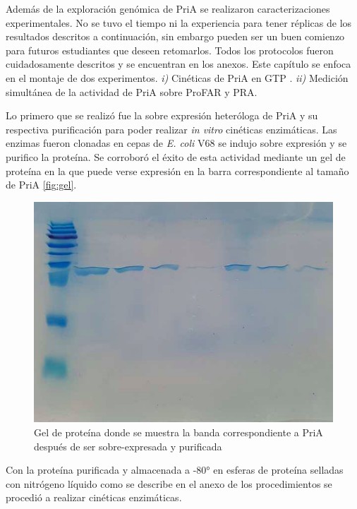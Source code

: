 \documentclass[12pt,twoside]{reedthesis}
\begin{document}
  Además de la exploración genómica de PriA se realizaron
  caracterizaciones experimentales. No se tuvo el tiempo ni la experiencia
  para tener réplicas de los resultados descritos a continuación, sin
  embargo pueden ser un buen comienzo para futuros estudiantes que deseen
  retomarlos. Todos los protocolos fueron cuidadosamente descritos y se
  encuentran en los anexos. Este capítulo se enfoca en el montaje de dos
  experimentos. \emph{i)} Cinéticas de PriA en GTP . \emph{ii)} Medición
  simultánea de la actividad de PriA sobre ProFAR y PRA.
  
  Lo primero que se realizó fue la sobre expresión heteróloga de PriA y su
  respectiva purificación para poder realizar \emph{in vitro} cinéticas
  enzimáticas. Las enzimas fueron clonadas en cepas de \emph{E. coli} V68
  se indujo sobre expresión y se purifico la proteína. Se corroboró el
  éxito de esta actividad mediante un gel de proteína en la que puede
  verse expresión en la barra correspondiente al tamaño de PriA
  \autoref{fig:gel}.
  
  \begin{figure}[h!tbp]
  \centering
  \includegraphics[angle = 0,scale = 0.6]{chapter4/Geles/PriAAbril30.png}
  \caption[gel]{\footnotesize{Gel de proteína donde se muestra la banda correspondiente a PriA después de ser sobre-expresada y purificada}}
  \label{fig:gel}
  \end{figure}
  
  Con la proteína purificada y almacenada a -80° en esferas de proteína
  selladas con nitrógeno líquido como se describe en el anexo de los
  procedimientos se procedió a realizar cinéticas enzimáticas.
  
\end{document}
